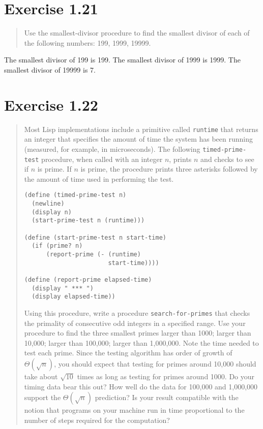 \documentclass{article}
\begin{document}
\section{Exercise 1.21}
\begin{quote}
    Use the smallest-divisor procedure to find the smallest divisor of each of
    the following numbers: 199, 1999, 19999.
\end{quote}

The smallest divisor of 199 is 199. The smallest divisor of 1999 is 1999. The
smallest divisor of 19999 is 7.

\section{Exercise 1.22}
\begin{quote}
    Most Lisp implementations include a primitive called \texttt{runtime} that
    returns an integer that specifies the amount of time the system has been
    running (measured, for example, in microseconds). The following
    \texttt{timed-prime-test} procedure, when called with an integer $n$,
    prints $n$ and checks to see if $n$ is prime. If $n$ is prime, the
    procedure prints three asterisks followed by the amount of time used in
    performing the test.

    \begin{lstlisting}
(define (timed-prime-test n)
  (newline)
  (display n)
  (start-prime-test n (runtime)))

(define (start-prime-test n start-time)
  (if (prime? n)
      (report-prime (- (runtime)
                       start-time))))

(define (report-prime elapsed-time)
  (display " *** ")
  (display elapsed-time))
    \end{lstlisting}

    Using this procedure, write a procedure \texttt{search-for-primes} that
    checks the primality of consecutive odd integers in a specified range. Use
    your procedure to find the three smallest primes larger than 1000; larger
    than 10,000; larger than 100,000; larger than 1,000,000. Note the time
    needed to test each prime. Since the testing algorithm has order of growth
    of $\Theta(\sqrt{n})$, you should expect that testing for primes around
    10,000 should take about $\sqrt{10}$ times as long as testing for primes
    around 1000. Do your timing data bear this out? How well do the data for
    100,000 and 1,000,000 support the $\Theta(\sqrt{n})$ prediction? Is your
    result compatible with the notion that programs on your machine run in time
    proportional to the number of steps required for the computation?
\end{quote}
\end{document}
